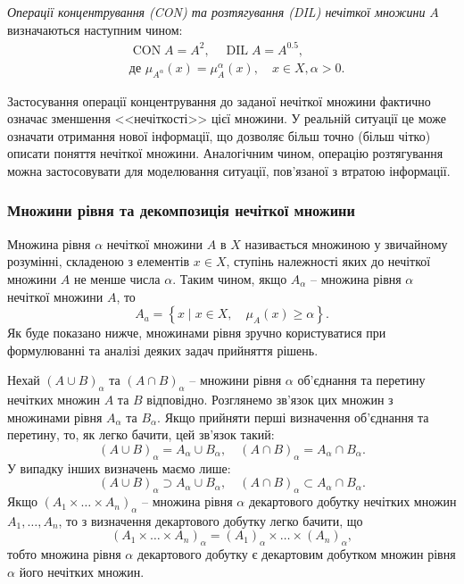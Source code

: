 \documentclass[14pt, a4paper, oneside]{extarticle}
\numberwithin{equation}{section}
\begin{document}
\textit{Операції концентрування (CON) та розтягування (DIL) нечіткої множини} $A$ визначаються наступним чином:
\begin{align*}
& \operatorname{CON} A = A^2, \quad \operatorname{DIL} A = A^{0.5},\\
& \text{де } \mu_{A^\alpha}(x) = \mu_A^\alpha(x), \quad x\in X, \alpha > 0.
\end{align*}

Застосування операції концентрування до заданої нечіткої множини фактично означає зменшення <<нечіткості>> цієї множини. У реальній ситуації це може означати отримання нової інформації, що дозволяє більш точно (більш чітко) описати поняття нечіткої множини. Аналогічним чином, операцію розтягування можна застосовувати для моделювання ситуації, пов'язаної з втратою інформації.

\subsubsection{Множини рівня та декомпозиція нечіткої множини}

Множина рівня $\alpha$ нечіткої множини $A$ в $X$ називається множиною у звичайному розумінні, складеною з елементів $x \in X$, ступінь належності яких до нечіткої множини $A$ не менше числа $\alpha$. Таким чином, якщо $A_\alpha$ -- множина рівня $\alpha$ нечіткої множини $A$, то
\begin{equation*}
A_a=\left\{x \mid x \in X, \quad \mu_A(x) \geq \alpha\right\} .
\end{equation*}
Як буде показано нижче, множинами рівня зручно користуватися при формулюванні та аналізі деяких задач прийняття рішень.

Нехай $(A \cup B)_\alpha$ та $(A \cap B)_\alpha$ -- множини рівня $\alpha$ об'єднання та перетину нечітких множин $A$ та $B$ відповідно. Розглянемо зв'язок цих множин з множинами рівня $A_\alpha$ та $B_{\alpha}$. Якщо прийняти перші визначення об'єднання та перетину, то, як легко бачити, цей зв'язок такий:
\begin{equation*}
(A \cup B)_\alpha=A_\alpha \cup B_\alpha, \quad(A \cap B)_\alpha=A_\alpha \cap B_{\alpha}.
\end{equation*}
У випадку інших визначень маємо лише:
\begin{equation*}
(A \cup B)_\alpha \supset A_\alpha \cup B_\alpha, \quad(A \cap B)_\alpha \subset A_\alpha \cap B_{\alpha}.
\end{equation*}
Якщо $\left(A_1 \times \ldots \times A_n\right)_\alpha$ -- множина рівня $\alpha$ декартового добутку нечітких множин $A_1, \ldots, A_n$, то з визначення декартового добутку легко бачити, що
\begin{equation*}
\left(A_1 \times \ldots \times A_n\right)_\alpha=\left(A_1\right)_\alpha \times \ldots \times\left(A_n\right)_\alpha,
\end{equation*}
тобто множина рівня $\alpha$ декартового добутку є декартовим добутком множин рівня $\alpha$ його нечітких множин.
\end{document}
